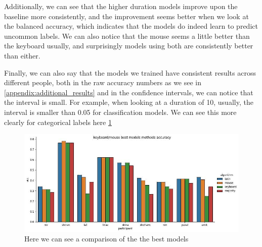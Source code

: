     Additionally, we can see that the higher duration models improve upon the baseline more consistently, 
    and the improvement seems better when we look at the balanced accuracy, which indicates that the models do indeed learn to predict uncommon labels. 
    We can also notice that the mouse seems a little better than the keyboard usually, and surprisingly models using both are consistently better than either. 

    Finally, we can also say that the models we trained have consistent results across different people, both in the raw accuracy numbers as we see in 
    \ref{appendix:additional_results} and in the confidence intervals, we can notice that the interval is small. For example, when looking at a duration of 10, 
    usually, the interval is smaller than 0.05 for classification models.
    We can see this more clearly for categorical labels here \ref{fig:categorical_kbm}

    \begin{figure}
        \centering
        \includegraphics[width=14cm]{figures/results/categorical_kbm}   
        \caption{Here we can see a comparison of the the best models}
        \label{fig:categorical_kbm} 
    \end{figure}

